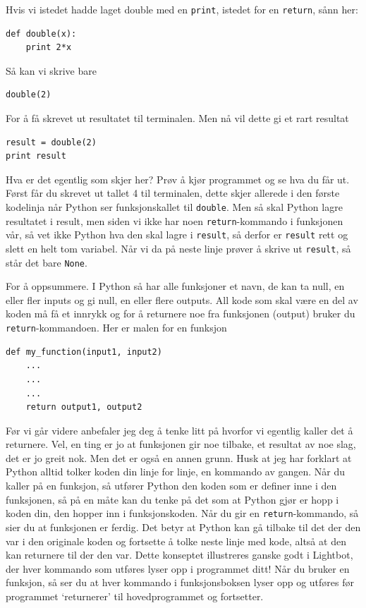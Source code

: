 \documentclass[a4paper, 11pt, notitlepage]{article}
\begin{document}
Hvis vi istedet hadde laget double med en \verb+print+, istedet for en \verb+return+, sånn her:
\begin{lstlisting}
def double(x):
	print 2*x
\end{lstlisting}
Så kan vi skrive bare
\begin{lstlisting}
double(2)
\end{lstlisting}
For å få skrevet ut resultatet til terminalen. Men nå vil dette gi et rart resultat
\begin{lstlisting}
result = double(2)
print result
\end{lstlisting}
Hva er det egentlig som skjer her? Prøv å kjør programmet og se hva du får ut. Først får du skrevet ut tallet 4 til terminalen, dette skjer allerede i den første kodelinja når Python ser funksjonskallet til \verb+double+. Men så skal Python lagre resultatet i result, men siden vi ikke har noen \verb+return+-kommando i funksjonen vår, så vet ikke Python hva den skal lagre i \verb+result+, så derfor er \verb+result+ rett og slett en helt tom variabel. Når vi da på neste linje prøver å skrive ut \verb+result+, så står det bare \verb+None+.



For å oppsummere. I Python så har alle funksjoner et navn, de kan ta null, en eller fler inputs og gi null, en eller flere outputs. All kode som skal være en del av koden må få et innrykk og for å returnere noe fra funksjonen (output) bruker du \verb+return+-kommandoen. Her er malen for en funksjon
\begin{lstlisting}
def my_function(input1, input2)
	...
	...
	...
	return output1, output2
\end{lstlisting}

Før vi går videre anbefaler jeg deg å tenke litt på hvorfor vi egentlig kaller det å returnere. Vel, en ting er jo at funksjonen gir noe tilbake, et resultat av noe slag, det er jo greit nok. Men det er også en annen grunn. Husk at jeg har forklart at Python alltid tolker koden din linje for linje, en kommando av gangen. Når du kaller på en funksjon, så utfører Python den koden som er definer inne i den funksjonen, så på en måte kan du tenke på det som at Python gjør er hopp i koden din, den hopper inn i funksjonskoden. Når du gir en \verb+return+-kommando, så sier du at funksjonen er ferdig. Det betyr at Python kan gå tilbake til det der den var i den originale koden og fortsette å tolke neste linje med kode, altså at den kan returnere til der den var. Dette konseptet illustreres ganske godt i Lightbot, der hver kommando som utføres lyser opp i programmet ditt! Når du bruker en funksjon, så ser du at hver kommando i funksjonsboksen lyser opp og utføres før programmet `returnerer' til hovedprogrammet og fortsetter.
\end{document}
